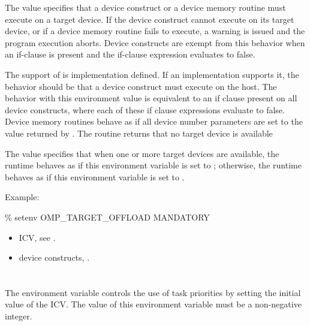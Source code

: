 
The  value specifies that a device construct or a device memory routine must execute on a target device. If the device construct cannot execute on its target device, or if a device memory routine fails to execute, a warning is issued and the program execution aborts. Device constructs are exempt from this behavior when an if-clause is present and the if-clause expression evaluates to false. 

The support of   is implementation defined. If an implementation supports it, the behavior should be that a device construct must execute on the host.  The behavior with this environment value is equivalent to an if clause present on all device constructs, where each of these if clause expressions evaluate to false. Device memory routines behave as if all device number parameters are set to the value returned by . The  routine returns that no target device is available

The  value specifies that when one or more target devices are available, the runtime behaves as if this environment variable is set to ; otherwise, the runtime behaves as if this environment variable is set to .

Example:
\begin{boxedcode}
\% setenv OMP\_TARGET\_OFFLOAD MANDATORY
\end{boxedcode}

\crossreferences
\begin{itemize}
\item {} ICV, see .
\item device constructs, .
\end{itemize}




\section{}
\label{sec:OMP_MAX_TASK_PRIORITY}

The  environment variable controls the use of task
priorities by setting the initial value of the  ICV. The
value of this environment variable must be a non-negative integer. 

